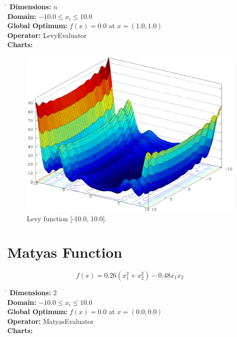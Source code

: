 \documentclass[12pt, a4paper]{article}
\begin{document}
		\begin{tabbing}
			\hspace{5cm}\=\kill
			\textbf{Dimensions:}     \> $n$ \\
			\textbf{Domain:}         \> $-10.0 \leq x_i \leq 10.0$ \\
			\textbf{Global Optimum:} \> $f(x) = 0.0$ at $x = (1.0, 1.0)$ \\
			\textbf{Operator:}       \> LevyEvaluator \\
			\textbf{Charts:}         \> \\
		\end{tabbing}

		\begin{figure}[ht]
			\includegraphics[width=\textwidth]{Images/Levy}
			\caption{Levy function [-10.0, 10.0].}
		\end{figure}

	\newpage

	\section*{Matyas Function}
		\begin{equation*}
			f(x)=0.26(x_1^2+x_2^2)-0.48x_1x_2
		\end{equation*}

		\begin{tabbing}
			\hspace{5cm}\=\kill
			\textbf{Dimensions:}     \> $2$ \\
			\textbf{Domain:}         \> $-10.0 \leq x_i \leq 10.0$ \\
			\textbf{Global Optimum:} \> $f(x) = 0.0$ at $x = (0.0, 0.0)$ \\
			\textbf{Operator:}       \> MatyasEvaluator \\
			\textbf{Charts:}         \> \\
		\end{tabbing}
\end{document}
